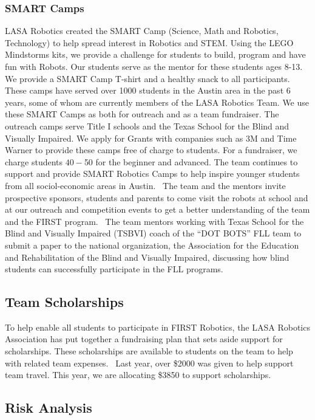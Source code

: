 \subsubsection{SMART Camps}
LASA Robotics created the SMART Camp (Science, Math and Robotics, Technology) to help spread interest in Robotics and STEM.  Using the LEGO Mindstorms kits, we provide a challenge for students to build, program and have fun with Robots. Our students serve as the mentor for these students ages 8-13.  We provide a SMART Camp T-shirt and a healthy snack to all participants.  These camps have served over 1000 students in the Austin area in the past 6 years, some of whom are currently members of the LASA Robotics Team.  We use these SMART Camps as both for outreach and as a team fundraiser.   The outreach camps serve Title I schools and the Texas School for the Blind and Visually Impaired.  We apply for Grants with companies such as 3M and Time Warner to provide these camps free of charge to students.  For a fundraiser, we charge students $40-$50 for the beginner and advanced.  The team continues to support and provide SMART Robotics Camps to help inspire younger students from all sociol-economic areas in Austin.  The team and the mentors invite prospective sponsors, students and parents to come visit the robots at school and at our outreach and competition events to get a better understanding of the team and the FIRST program.  The team mentors working with Texas School for the Blind and Visually Impaired (TSBVI) coach of the “DOT BOTS” FLL team to submit a paper to the national organization, the Association for the Education and Rehabilitation of the Blind and Visually Impaired, discussing how blind students can successfully participate in the FLL programs.          

\subsection{Team Scholarships}
To help enable all students to participate in FIRST Robotics, the LASA Robotics Association has put together a fundraising plan that sets aside support for scholarships. These scholarships are available to students on the team to help with related team expenses.  Last year, over \$2000 was given to help support team travel. This year, we are allocating \$3850 to support scholarships.

\subsection{Risk Analysis}
